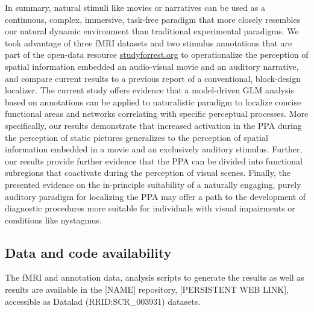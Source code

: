 \documentclass[english]{article}
\begin{document}
In summary, natural stimuli like movies \citep{eickhoff2020towards,
hasson2008neurocinematics, sonkusare2019naturalistic} or narratives
\citep{hamilton2018revolution, honey2012not, lerner2011topographic,
silbert2014coupled, wilson2008beyond} can be used as a continuous, complex,
immersive, task-free paradigm that more closely resembles our natural dynamic
environment than traditional experimental paradigms.
We took advantage of three fMRI datasets and two stimulus annotations that are
part of the open-data resource
\href{http://www.studyforrest.org}{studyforrest.org} to operationalize the
perception of spatial information embedded an audio-visual movie and an
auditory narrative, and compare current results to a previous report of a
conventional, block-design localizer.
The current study offers evidence that a model-driven GLM analysis based on
annotations can be applied to naturalistic paradigm to localize concise
functional areas and networks correlating with specific perceptual processes.
More specifically, our results demonstrate that increased activation in the PPA
during the perception of static pictures generalizes to the perception of
spatial information embedded in a movie and an exclusively auditory stimulus.
Further, our results provide further evidence that the PPA can be divided into
functional subregions that coactivate during the perception of visual scenes.
Finally, the presented evidence on the in-principle suitability of a naturally
engaging, purely auditory paradigm for localizing the PPA may offer a path to
the development of diagnostic procedures more suitable for individuals with
visual impairments or conditions like nystagmus.



\subsection*{Data and code availability}

The fMRI and annotation data, analysis scripts to generate the results as well
as results are available in the [NAME] repository, [PERSISTENT WEB LINK],
accessible as Datalad (RRID:SCR\_003931) datasets.
\end{document}

